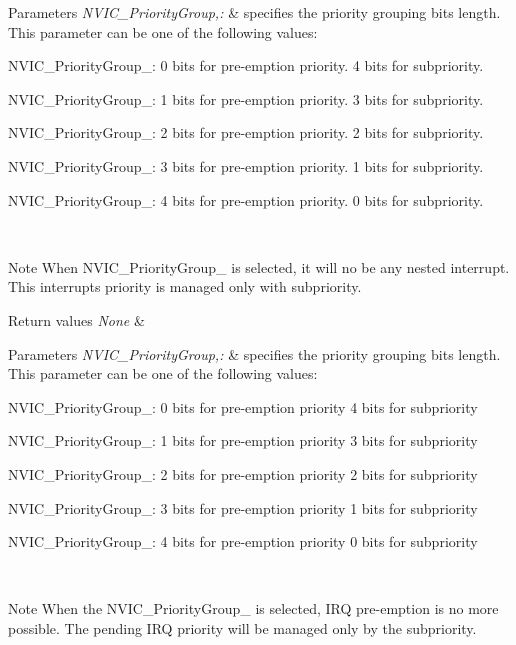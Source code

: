 \begin{DoxyParams}{Parameters}
{\em N\-V\-I\-C\-\_\-\-Priority\-Group,\-:} & specifies the priority grouping bits length. This parameter can be one of the following values\-: \begin{DoxyItemize}
\item N\-V\-I\-C\-\_\-\-Priority\-Group\-\_\-: 0 bits for pre-\/emption priority. 4 bits for subpriority. \item N\-V\-I\-C\-\_\-\-Priority\-Group\-\_\-: 1 bits for pre-\/emption priority. 3 bits for subpriority. \item N\-V\-I\-C\-\_\-\-Priority\-Group\-\_\-: 2 bits for pre-\/emption priority. 2 bits for subpriority. \item N\-V\-I\-C\-\_\-\-Priority\-Group\-\_\-: 3 bits for pre-\/emption priority. 1 bits for subpriority. \item N\-V\-I\-C\-\_\-\-Priority\-Group\-\_\-: 4 bits for pre-\/emption priority. 0 bits for subpriority. \end{DoxyItemize}
\\
\hline
\end{DoxyParams}
\begin{DoxyNote}{Note}
When N\-V\-I\-C\-\_\-\-Priority\-Group\-\_ is selected, it will no be any nested interrupt. This interrupts priority is managed only with subpriority. 
\end{DoxyNote}

\begin{DoxyRetVals}{Return values}
{\em None} & \\
\hline
\end{DoxyRetVals}

\begin{DoxyParams}{Parameters}
{\em N\-V\-I\-C\-\_\-\-Priority\-Group,\-:} & specifies the priority grouping bits length. This parameter can be one of the following values\-: \begin{DoxyItemize}
\item N\-V\-I\-C\-\_\-\-Priority\-Group\-\_\-: 0 bits for pre-\/emption priority 4 bits for subpriority \item N\-V\-I\-C\-\_\-\-Priority\-Group\-\_\-: 1 bits for pre-\/emption priority 3 bits for subpriority \item N\-V\-I\-C\-\_\-\-Priority\-Group\-\_\-: 2 bits for pre-\/emption priority 2 bits for subpriority \item N\-V\-I\-C\-\_\-\-Priority\-Group\-\_\-: 3 bits for pre-\/emption priority 1 bits for subpriority \item N\-V\-I\-C\-\_\-\-Priority\-Group\-\_\-: 4 bits for pre-\/emption priority 0 bits for subpriority \end{DoxyItemize}
\\
\hline
\end{DoxyParams}
\begin{DoxyNote}{Note}
When the N\-V\-I\-C\-\_\-\-Priority\-Group\-\_ is selected, I\-R\-Q pre-\/emption is no more possible. The pending I\-R\-Q priority will be managed only by the subpriority. 
\end{DoxyNote}

